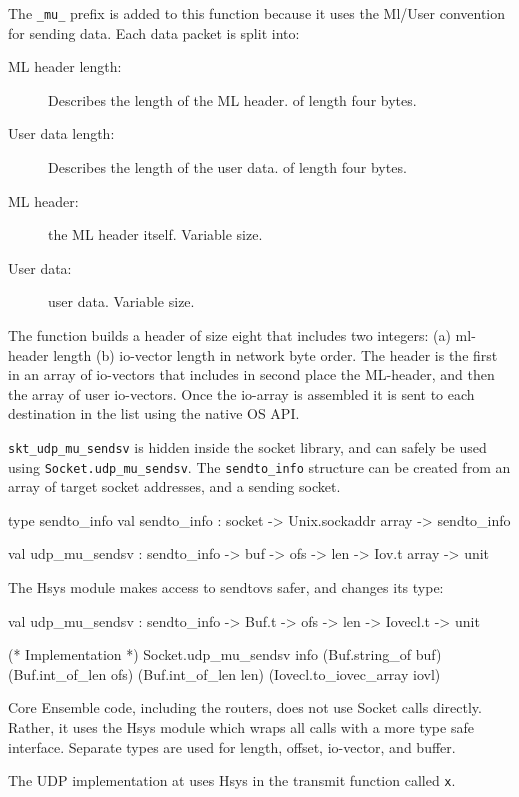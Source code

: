 The {\tt \_mu\_} prefix is added to this function
because it uses the Ml/User convention for sending data. Each data
packet is split into:
\begin{description}
\item [ML header length:] Describes the length of the ML header. of length four bytes. 
\item [User data length:] Describes the length of the user data. of length four bytes. 
\item [ML header:] the ML header itself. Variable size.
\item [User data:] user data. Variable size.
\end{description}

The function builds a header of size eight that includes two integers: (a)
ml-header length (b) io-vector length in network byte order. The
header is the first in an array of io-vectors that includes in second
place the ML-header, and then the array of user io-vectors. Once the
io-array is assembled it is sent to each destination in the list using
the native OS API. 

{\tt skt\_udp\_mu\_sendsv} is hidden inside the socket library, and can
safely be used using {\tt Socket.udp\_mu\_sendsv}. The {\tt sendto\_info}
structure can be created from an array of target socket addresses, and
a sending socket.

\begin{codebox}
type sendto_info
val sendto_info : socket -> Unix.sockaddr array -> sendto_info

val udp_mu_sendsv : sendto_info -> buf -> ofs -> len -> Iov.t array -> unit
\end{codebox}


The Hsys module makes access to sendtovs safer, and changes its type:
\begin{codebox}
  val udp_mu_sendsv : sendto_info -> Buf.t -> ofs -> len -> Iovecl.t -> unit

  (* Implementation *)
  Socket.udp_mu_sendsv info 
    (Buf.string_of buf) (Buf.int_of_len ofs) (Buf.int_of_len len) 
    (Iovecl.to_iovec_array iovl) 
\end{codebox}
Core Ensemble code, including the routers, does not use Socket calls
directly. Rather, it uses the Hsys module which wraps all calls with a
more type safe interface. Separate types are used for length, offset,
io-vector, and buffer.

The UDP implementation at  uses Hsys in the 
transmit function called {\tt x}.

